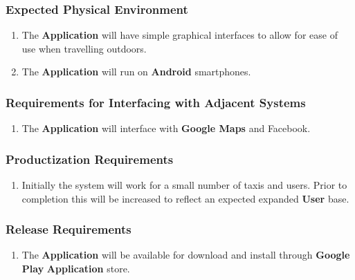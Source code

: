 \documentclass[english]{article}
\begin{document}
\subsubsection{Expected Physical Environment}
\label{ssub:expected_physical_environment}
\begin{enumerate}[{EPE}1. ]
	\item The \textbf{Application} will have simple graphical interfaces to allow for ease of use when travelling outdoors.
	\item The \textbf{Application} will run on  \textbf{Android} smartphones.
\end{enumerate}

\subsubsection{Requirements for Interfacing with Adjacent Systems}
\label{ssub:requirements_for_interfacing_with_adjacent_systems}
\begin{enumerate}[{RIAS}1. ]
	\item The \textbf{Application} will interface with \textbf{Google Maps} and Facebook.
\end{enumerate}

\subsubsection{Productization Requirements}
\label{ssub:productization_requirements}
\begin{enumerate}[{PR}1. ]
	\item Initially the system will work for a small number of taxis and users. Prior to completion this will be increased to reflect an expected expanded \textbf{User} base.
\end{enumerate}

\subsubsection{Release Requirements}
\label{ssub:release_requirements}
\begin{enumerate}[{RR}1. ]
	\item The \textbf{Application} will be available for download and install through \textbf{Google Play} \textbf{Application} store.
\end{enumerate}
\end{document}
